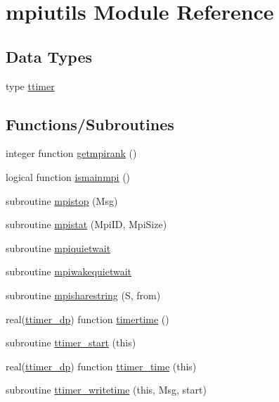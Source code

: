 \hypertarget{namespacempiutils}{}\section{mpiutils Module Reference}
\label{namespacempiutils}
\subsection*{Data Types}
\begin{DoxyCompactItemize}
\item 
type \mbox{\hyperlink{structmpiutils_1_1ttimer}{ttimer}}
\end{DoxyCompactItemize}
\subsection*{Functions/\+Subroutines}
\begin{DoxyCompactItemize}
\item 
integer function \mbox{\hyperlink{namespacempiutils_a10119a7c6a3093e9f38566d063e88364}{getmpirank}} ()
\item 
logical function \mbox{\hyperlink{namespacempiutils_a8c41001658ce5aafd28c17c28e215bf6}{ismainmpi}} ()
\item 
subroutine \mbox{\hyperlink{namespacempiutils_a23720e4e8b635dab4b67172618aa77e5}{mpistop}} (Msg)
\item 
subroutine \mbox{\hyperlink{namespacempiutils_af717f5183b6db768a0a9517d4737805e}{mpistat}} (Mpi\+ID, Mpi\+Size)
\item 
subroutine \mbox{\hyperlink{namespacempiutils_a81a7de07e984011ee5f1d69d403e6006}{mpiquietwait}}
\item 
subroutine \mbox{\hyperlink{namespacempiutils_a86ebeabf362ba28efbc4eae836b533bb}{mpiwakequietwait}}
\item 
subroutine \mbox{\hyperlink{namespacempiutils_a09da810020699894dfe6a3da8dd985c8}{mpisharestring}} (S, from)
\item 
real(\mbox{\hyperlink{namespacempiutils_a29264c4652e8287096a27ca2675edc26}{ttimer\+\_\+dp}}) function \mbox{\hyperlink{namespacempiutils_a22d9c100b7422621acc997902a9856f7}{timertime}} ()
\item 
subroutine \mbox{\hyperlink{namespacempiutils_af115575f9cb5cff0693d705e9f6b4704}{ttimer\+\_\+start}} (this)
\item 
real(\mbox{\hyperlink{namespacempiutils_a29264c4652e8287096a27ca2675edc26}{ttimer\+\_\+dp}}) function \mbox{\hyperlink{namespacempiutils_a45301d4a23c7b66f94ef24ded2062d8d}{ttimer\+\_\+time}} (this)
\item 
subroutine \mbox{\hyperlink{namespacempiutils_aec296fa19d748cab235ef01a63cdc289}{ttimer\+\_\+writetime}} (this, Msg, start)
\end{DoxyCompactItemize}
